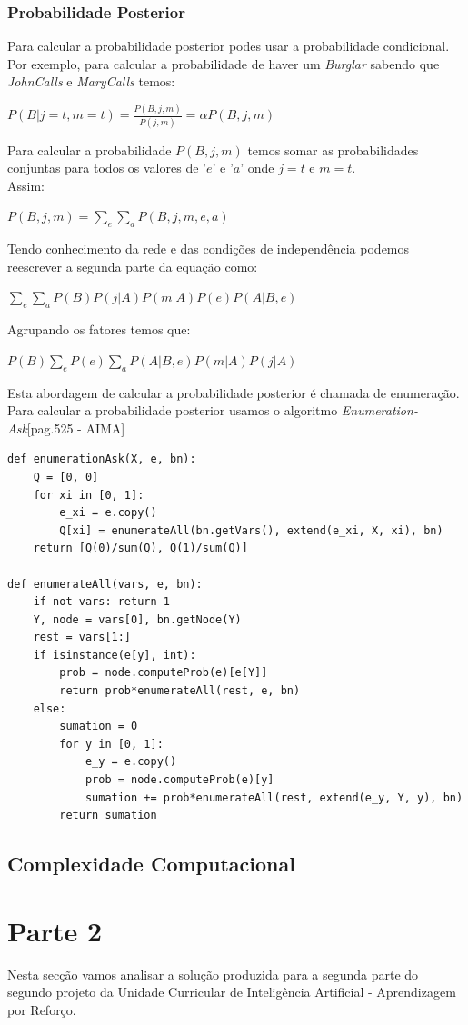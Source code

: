 \documentclass[11pt, a4paper, twocolumn]{article}
\begin{document}
\subsubsection{Probabilidade Posterior}
\hspace{10mm}Para calcular a probabilidade posterior podes usar a probabilidade condicional. Por exemplo, para calcular a probabilidade de haver um \textit{Burglar} sabendo que \textit{JohnCalls} e \textit{MaryCalls} temos:
\begin{center}
$P(B|j=t, m=t)=\displaystyle\frac{P(B,j,m)}{P(j,m)}=\alpha P(B,j,m)$
\end{center}
Para calcular a probabilidade $P(B, j, m)$ temos somar as probabilidades conjuntas para todos os valores de '$e$' e '$a$' onde $j=t$ e $m=t$.\\
Assim:
\begin{center}
$P(B, j, m) = \displaystyle\sum_{e}\sum_{a}P(B, j, m, e, a)$
\end{center}
Tendo conhecimento da rede e das condições de independência podemos reescrever a segunda parte da equação como:
\begin{center}
$\displaystyle\sum_{e}\sum_{a}P(B)P(j|A)P(m|A)P(e)P(A|B,e)$
\end{center}
Agrupando os fatores temos que:
\begin{center}
$P(B)\displaystyle\sum_{e}P(e)\displaystyle\sum_{a}P(A|B, e)P(m|A)P(j|A)$
\end{center}
Esta abordagem de calcular a probabilidade posterior é chamada de enumeração. Para calcular a probabilidade posterior usamos o algoritmo \emph{Enumeration-Ask}[pag.525 - AIMA]
\begin{lstlisting}
def enumerationAsk(X, e, bn):
	Q = [0, 0]
	for xi in [0, 1]:
		e_xi = e.copy()
		Q[xi] = enumerateAll(bn.getVars(), extend(e_xi, X, xi), bn)
	return [Q(0)/sum(Q), Q(1)/sum(Q)]
	
def enumerateAll(vars, e, bn):
	if not vars: return 1
	Y, node = vars[0], bn.getNode(Y)
	rest = vars[1:]
	if isinstance(e[y], int):
		prob = node.computeProb(e)[e[Y]]
		return prob*enumerateAll(rest, e, bn)
	else:
		sumation = 0
		for y in [0, 1]:
			e_y = e.copy()
			prob = node.computeProb(e)[y]
			sumation += prob*enumerateAll(rest, extend(e_y, Y, y), bn)
		return sumation
\end{lstlisting}
\subsection{Complexidade Computacional}

\section{Parte 2}
\hspace{10mm}Nesta secção vamos analisar a solução produzida para a segunda parte do segundo projeto da Unidade Curricular de Inteligência Artificial - Aprendizagem por Reforço.
\end{document}
